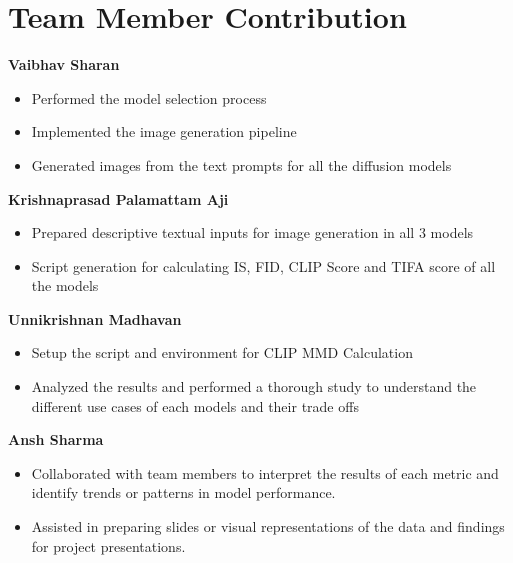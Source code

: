 \documentclass{article}
\begin{document}
\section{Team Member Contribution}
\textbf{Vaibhav Sharan}
\begin{itemize}
	\item Performed the model selection process
	\item Implemented the image generation pipeline
	\item Generated images from the text prompts for all the diffusion models 
\end{itemize}
\textbf{Krishnaprasad Palamattam Aji}
\begin{itemize}
	\item Prepared descriptive textual inputs for image generation in all 3 models
	\item Script generation for calculating IS, FID, CLIP Score and TIFA score of all the models
\end{itemize}
\textbf{Unnikrishnan Madhavan}
\begin{itemize}
	\item Setup the script and environment for CLIP MMD Calculation
	\item Analyzed the results and performed a thorough study to understand the different use cases of each models and their trade offs
\end{itemize}
\textbf{Ansh Sharma}
\begin{itemize}
	\item Collaborated with team members to interpret the results of each metric and identify trends or patterns in model performance.    
	\item Assisted in preparing slides or visual representations of the data and findings for project presentations.
\end{itemize}

\newpage

  
  
\end{document}
